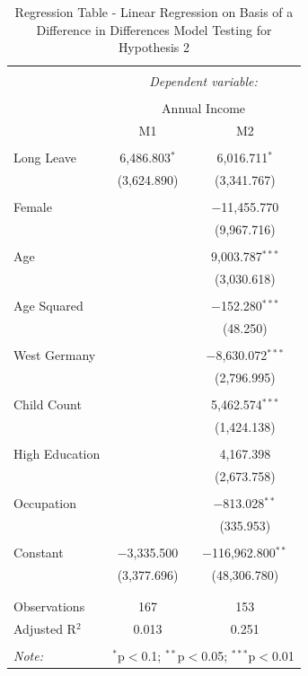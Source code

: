 \documentclass[
  12pt,
]{article}
\begin{document}
\begin{table}[!htbp] \centering 
  \caption{Regression Table - Linear Regression on Basis of a Difference in Differences Model Testing for Hypothesis 2} 
  \label{tab3} 
\footnotesize 
\begin{tabular}{@{\extracolsep{-5pt}}lcc} 
\\[-1.8ex]\hline 
\hline \\[-1.8ex] 
 & \multicolumn{2}{c}{\textit{Dependent variable:}} \\ 
\cline{2-3} 
\\[-1.8ex] & \multicolumn{2}{c}{Annual Income} \\ 
 & M1 & M2 \\ 
\hline \\[-1.8ex] 
 Long Leave & 6,486.803$^{*}$ & 6,016.711$^{*}$ \\ 
  & (3,624.890) & (3,341.767) \\ 
  & & \\ 
 Female &  & $-$11,455.770 \\ 
  &  & (9,967.716) \\ 
  & & \\ 
 Age &  & 9,003.787$^{***}$ \\ 
  &  & (3,030.618) \\ 
  & & \\ 
 Age Squared &  & $-$152.280$^{***}$ \\ 
  &  & (48.250) \\ 
  & & \\ 
 West Germany &  & $-$8,630.072$^{***}$ \\ 
  &  & (2,796.995) \\ 
  & & \\ 
 Child Count &  & 5,462.574$^{***}$ \\ 
  &  & (1,424.138) \\ 
  & & \\ 
 High Education &  & 4,167.398 \\ 
  &  & (2,673.758) \\ 
  & & \\ 
 Occupation &  & $-$813.028$^{**}$ \\ 
  &  & (335.953) \\ 
  & & \\ 
 Constant & $-$3,335.500 & $-$116,962.800$^{**}$ \\ 
  & (3,377.696) & (48,306.780) \\ 
  & & \\ 
\hline \\[-1.8ex] 
Observations & 167 & 153 \\ 
Adjusted R$^{2}$ & 0.013 & 0.251 \\ 
\hline 
\hline \\[-1.8ex] 
\textit{Note:}  & \multicolumn{2}{r}{$^{*}$p$<$0.1; $^{**}$p$<$0.05; $^{***}$p$<$0.01} \\ 
\end{tabular} 
\end{table}
\end{document}
